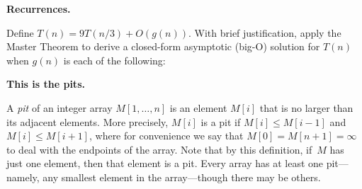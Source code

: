 \documentclass[11pt,addpoints]{exam}
\begin{document}
\begin{questions}
  \begin{solution}
        
  \end{solution}

     \question \textbf{Recurrences.} \nopagebreak
  
  Define $T(n)= 9T(n/3) + O(g(n))$.
  With brief justification, apply the Master Theorem to derive a closed-form asymptotic (big-O) solution for $T(n)$ when $g(n)$ is each of the following:



 \question[15] \textbf{This is the pits.} \nopagebreak

  A \emph{pit} of an integer array $M[1,\ldots, n]$ is an element $M[i]$ that is no larger than its adjacent elements.
  More precisely, $M[i]$ is a pit if $M[i] \leq M[i-1]$ and $M[i] \leq M[i+1]$, where for convenience we say that $M[0] = M[n+1] = \infty$ to deal with the endpoints of the array.
  Note that by this definition, if~$M$ has just one element, then that element is a pit.
  Every array has at least one pit---namely, any smallest element in the array---though there may be others.
    

\end{questions}
\end{document}
